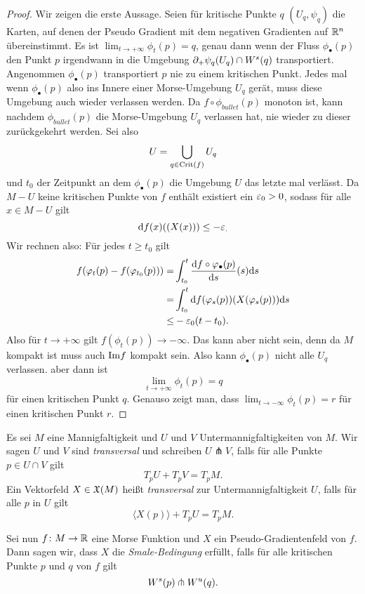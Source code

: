 \begin{proof}
    Wir zeigen die erste Aussage. Seien für kritische Punkte $q$ $(U_q, \psi_q)$ die Karten, 
    auf denen der Pseudo Gradient mit dem negativen Gradienten auf ${ \mathbb R }^n$ übereinstimmt. 
    Es ist $\lim_{t \to + \infty} \phi_t(p) = q$, genau dann wenn
    der Fluss $\phi_{\bullet}(p)$ den Punkt $p$ irgendwann in die Umgebung 
    ${ \partial }_+\psi_q(U_q) \cap { W^s }(q)$ transportiert. Angenommen $\phi_{\bullet}(p)$ transportiert
    $p$ nie zu einem kritischen Punkt. Jedes mal wenn $\phi_{\bullet}(p)$ also ins Innere einer
    Morse-Umgebung $U_q$ gerät, muss diese Umgebung auch wieder verlassen werden. Da 
    $f \circ \phi_{bullet}(p)$ monoton ist, kann nachdem $\phi_{bullet}(p)$ die Morse-Umgebung $U_q$
    verlassen hat, nie wieder zu dieser zurückgekehrt werden.
    Sei also 
    \[ U = \bigcup_{q \in { \operatorname{Crit} }(f)} U_q \]
    und $t_0$ der Zeitpunkt an dem $\phi_{\bullet} (p)$ die Umgebung $U$ das letzte mal verlässt.
    Da $M - U$ keine kritischen Punkte von $f$ enthält existiert ein $\varepsilon_0 > 0$, sodass für alle 
    $x \in M - U$ gilt 
    \[ { \operatorname{d} } f (x) ((X(x))) \leq - \varepsilon_ . \]
    Wir rechnen also: Für jedes $t \geq t_0$ gilt
    \begin{align*}
        f(\varphi_t(p) - f(\varphi_{t_0}(p))) = & 
            \int_{t_0}^t \derive[f \circ \phi_{\bullet}(p)]{s} (s) \opd s \\
        = & \int_{t_0}^t \opd f (\phi_s(p)) (X(\phi_s(p))) \opd s \\
        \leq & - \eps_0 (t - t_0) . 
    \end{align*}
    Also für $t \to + \infty$ gilt $f(\phi_t(p)) \to - \infty$. Das kann aber nicht sein, denn da 
    $M$ kompakt ist muss auch ${ \operatorname{Im} } f$ kompakt sein. Also kann $\phi_{\bullet}(p)$ nicht alle 
    $U_q$ verlassen. aber dann ist 
    \[ \lim_{t \to + \infty} \phi_t(p) = q \]
    für einen kritischen Punkt $q$.
    Genauso zeigt man, dass $\lim_{t \to - \infty} \phi_t(p) = r$ für einen kritischen Punkt $r$.
\end{proof}

\begin{definition}
    \label{def: smale-bedingung}
    Es sei $M$ eine Mannigfaltigkeit und $U$ und $V$ Untermannigfaltigkeiten von $M$. Wir sagen 
    $U$ und $V$ sind \textit{transversal} und schreiben $U \pitchfork V$, falls für alle Punkte 
    $p \in U \cap V$ gilt 
    \[ T_pU + T_pV = T_pM . \]
    Ein Vektorfeld $X \in { \mathfrak{X} } (M)$ heißt \textit{transversal} zur Untermannigfaltigkeit $U$, falls 
    für alle $p$ in $U$ gilt 
    \[ \langle X(p) \rangle + T_pU = T_pM . \]

    Sei nun $f \colon M \to { \mathbb R }$ eine Morse Funktion und $X$ ein Pseudo-Gradientenfeld von $f$. Dann sagen
    wir, dass $X$ die \textit{Smale-Bedingung} erfüllt, falls für alle kritischen Punkte $p$ und $q$ von 
    $f$ gilt 
    \[ { W^s } (p) \pitchfork { W^u } (q) . \]
\end{definition}

